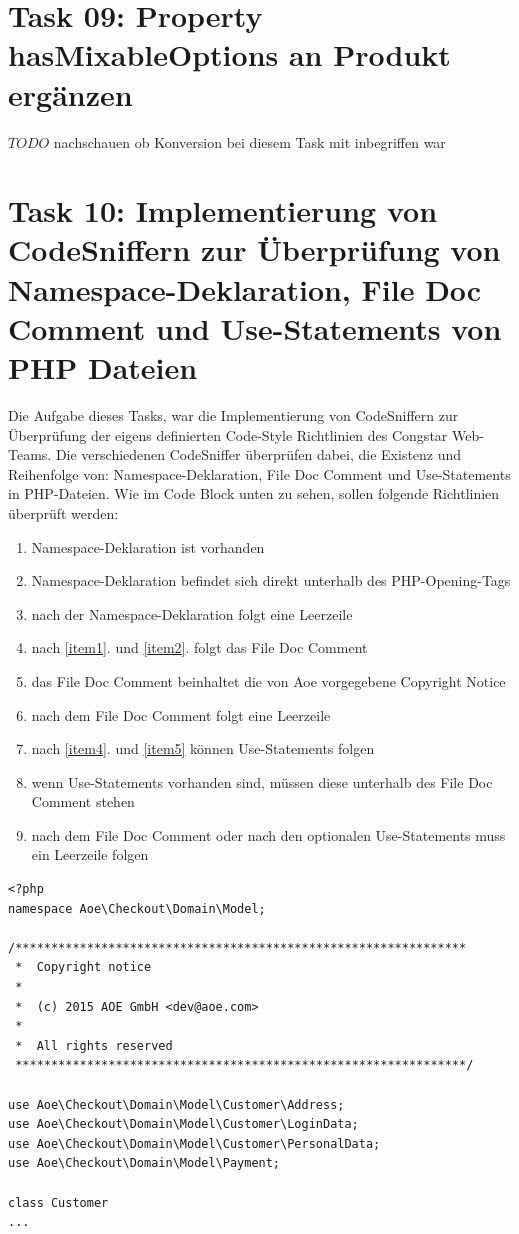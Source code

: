 \documentclass[11pt,a4paper]{article} %
\begin{document}
\section{Task 09: Property hasMixableOptions an Produkt ergänzen}

$TODO$ nachschauen ob Konversion bei diesem Task mit inbegriffen war

\section{Task 10: Implementierung von CodeSniffern zur Überprüfung von Namespace-Deklaration, File Doc Comment und Use-Statements von PHP Dateien}

Die Aufgabe dieses Tasks, war die Implementierung von CodeSniffern zur Überprüfung
der eigens definierten Code-Style Richtlinien des Congstar Web-Teams. Die verschiedenen CodeSniffer 
überprüfen dabei, die Existenz und Reihenfolge von: Namespace-Deklaration, 
File Doc Comment und Use-Statements in PHP-Dateien. Wie im Code Block unten zu sehen, sollen 
folgende Richtlinien überprüft werden:

\begin{enumerate}
  \item Namespace-Deklaration ist vorhanden
  \item Namespace-Deklaration befindet sich direkt unterhalb des PHP-Opening-Tags \label{item1}
  \item nach der Namespace-Deklaration folgt eine Leerzeile \label{item2}
  \item nach \ref{item1}. und \ref{item2}. folgt das File Doc Comment
  \item das File Doc Comment beinhaltet die von Aoe vorgegebene Copyright Notice \label{item4}
  \item nach dem File Doc Comment folgt eine Leerzeile \label{item5}
  \item nach \ref{item4}. und \ref{item5} können Use-Statements folgen
  \item wenn Use-Statements vorhanden sind, müssen diese unterhalb des File Doc Comment stehen
  \item nach dem File Doc Comment oder nach den optionalen Use-Statements muss ein Leerzeile folgen
\end{enumerate}

\begin{lstlisting} 
<?php
namespace Aoe\Checkout\Domain\Model;
 
/***************************************************************
 *  Copyright notice
 *
 *  (c) 2015 AOE GmbH <dev@aoe.com>
 *
 *  All rights reserved
 ***************************************************************/
 
use Aoe\Checkout\Domain\Model\Customer\Address;
use Aoe\Checkout\Domain\Model\Customer\LoginData;
use Aoe\Checkout\Domain\Model\Customer\PersonalData;
use Aoe\Checkout\Domain\Model\Payment;
 
class Customer
...
\end{lstlisting} \label{codesniffer}
\end{document}

